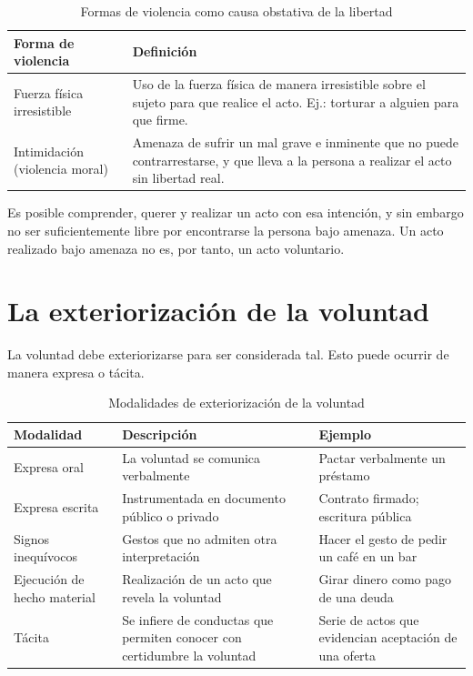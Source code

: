 \documentclass[12pt,oneside]{book}
\begin{document}
\begin{table}[H]
\centering
\caption{Formas de violencia como causa obstativa de la libertad}
\begin{tabularx}{\textwidth}{l X}
\toprule
\textbf{Forma de violencia} & \textbf{Definición} \\
\midrule
Fuerza física irresistible & Uso de la fuerza física de manera irresistible sobre el sujeto para que realice el acto. Ej.: torturar a alguien para que firme. \\
Intimidación (violencia moral) & Amenaza de sufrir un mal grave e inminente que no puede contrarrestarse, y que lleva a la persona a realizar el acto sin libertad real. \\
\bottomrule
\end{tabularx}
\end{table}

Es posible comprender, querer y realizar un acto con esa intención, y sin embargo no ser suficientemente libre por encontrarse la persona bajo amenaza. Un acto realizado bajo amenaza no es, por tanto, un acto voluntario.

\section{La exteriorización de la voluntad}

La voluntad debe exteriorizarse para ser considerada tal. Esto puede ocurrir de manera expresa o tácita.

\begin{table}[H]
\centering
\caption{Modalidades de exteriorización de la voluntad}
\begin{tabularx}{\textwidth}{l X X}
\toprule
\textbf{Modalidad} & \textbf{Descripción} & \textbf{Ejemplo} \\
\midrule
Expresa oral & La voluntad se comunica verbalmente & Pactar verbalmente un préstamo \\
Expresa escrita & Instrumentada en documento público o privado & Contrato firmado; escritura pública \\
Signos inequívocos & Gestos que no admiten otra interpretación & Hacer el gesto de pedir un café en un bar \\
Ejecución de hecho material & Realización de un acto que revela la voluntad & Girar dinero como pago de una deuda \\
Tácita & Se infiere de conductas que permiten conocer con certidumbre la voluntad & Serie de actos que evidencian aceptación de una oferta \\
\bottomrule
\end{tabularx}
\end{table}
\end{document}
